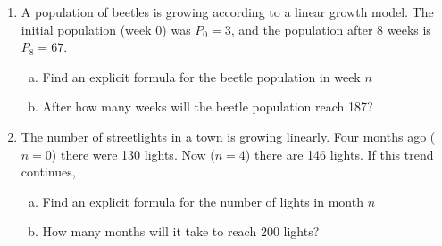\documentclass{article}
\begin{document}
\begin{enumerate}[resume]
\begin{enumerate}[a.)]
    \end{enumerate}
\item A population of beetles is growing according to a linear growth model. The initial population (week 0) was $P_0=3$, and the population after 8 weeks is $P_8=67$.
    \begin{enumerate}[a.)] 
    \item Find an explicit formula for the beetle population in week $n$ 
    \item After how many weeks will the beetle population reach 187?
    \end{enumerate}
\item The number of streetlights in a town is growing linearly. Four months ago ($n = 0$) there were 130 lights. Now ($n = 4$) there are 146 lights. If this trend continues,
    \begin{enumerate}[a.)]
    \item Find an explicit formula for the number of lights in month $n$
    \item How many months will it take to reach 200 lights?
    \end{enumerate}
\end{enumerate}
\end{document}
